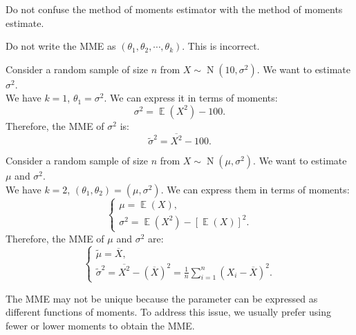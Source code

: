 \documentclass{huhtakm-template-book-v2}
\DeclareMathOperator{\E}{\mathbb{E}}
\DeclareMathOperator{\N}{N}
\begin{document}
    \begin{rem}
        Do not confuse the method of moments estimator with the method of moments estimate.
    \end{rem}
    \begin{rem}
        Do not write the MME as $(\theta_{1}, \theta_{2}, \cdots, \theta_{k})$. This is incorrect.
    \end{rem}
	\begin{eg}
        Consider a random sample of size $n$ from $X \sim \N(10, \sigma^{2})$. We want to estimate $\sigma^{2}$.\\
        We have $k = 1$, $\theta_{1} = \sigma^{2}$. We can express it in terms of moments:
        \begin{equation*}
            \sigma^{2} = \E(X^{2}) - 100.
        \end{equation*}
        Therefore, the MME of $\sigma^{2}$ is:
        \begin{equation*}
            \widetilde{\sigma}^{2} = \overline{X^{2}} - 100.
        \end{equation*}
    \end{eg}
    \begin{eg}
        Consider a random sample of size $n$ from $X \sim \N(\mu, \sigma^{2})$. We want to estimate $\mu$ and $\sigma^{2}$.\\
        We have $k = 2$, $(\theta_{1}, \theta_{2}) = (\mu, \sigma^{2})$. We can express them in terms of moments: 
        \begin{equation*}
            \begin{cases}
                \mu = \E(X),\\
                \sigma^{2} = \E(X^{2}) - [\E(X)]^{2}.
            \end{cases}
        \end{equation*}
        Therefore, the MME of $\mu$ and $\sigma^{2}$ are:
        \begin{equation*}
            \begin{cases}
                \widetilde{\mu} = \overline{X},\\
                \widetilde{\sigma}^{2} = \overline{X^{2}} - (\overline{X})^{2} = \frac{1}{n} \sum_{i=1}^{n} (X_{i} - \overline{X})^{2}.
            \end{cases}
        \end{equation*}
    \end{eg}
    \begin{rem}
        The MME may not be unique because the parameter can be expressed as different functions of moments. To address this issue, we usually prefer using fewer or lower moments to obtain the MME.
    \end{rem}
\end{document}
